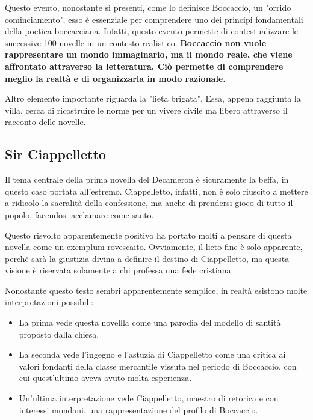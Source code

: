 \documentclass[10pt,a4paper]{article}
\begin{document}
Questo evento, nonostante si presenti, come lo definisce Boccaccio, un "orrido cominciamento", esso è essenziale per comprendere uno dei principi fondamentali della poetica boccacciana. Infatti, questo evento permette di contestualizzare le successive 100 novelle in un contesto realistico. \textbf{Boccaccio non vuole rappresentare un mondo immaginario, ma il mondo reale, che viene affrontato attraverso la letteratura. Ciò permette di comprendere meglio la realtà e di organizzarla in modo razionale.}

Altro elemento importante riguarda la "lieta brigata". Essa, appena raggiunta la villa, cerca di ricostruire le norme per un vivere civile ma libero attraverso il racconto delle novelle.

\subsection{Sir Ciappelletto}

Il tema centrale della prima novella del Decameron è sicuramente la beffa, in questo caso portata all'estremo. Ciappelletto, infatti, non è solo riuscito a mettere a ridicolo la sacralità della confessione, ma anche di prendersi gioco di tutto il popolo, facendosi acclamare come santo.

Questo risvolto apparentemente positivo ha portato molti a pensare di questa novella come un exemplum rovescaito. Ovviamente, il lieto fine è solo apparente, perchè sarà la giustizia divina a definire il destino di Ciappelletto, ma questa visione è riservata solamente a chi professa una fede cristiana.

Nonostante questo testo sembri apparentemente semplice, in realtà esistono molte interpretazioni possibili:
\begin{itemize}
	\item La prima vede questa novellla come una parodia del modello di santità proposto dalla chiesa.
	\item La seconda vede l'ingegno e l'astuzia di Ciappelletto come una critica ai valori fondanti della classe mercantile vissuta nel periodo di Boccaccio, con cui quest'ultimo aveva avuto molta esperienza.
	\item Un'ultima interpretazione vede Ciappelletto, maestro di retorica e con interessi mondani, una rappresentazione del profilo di Boccaccio.
\end{itemize}
\end{document}
